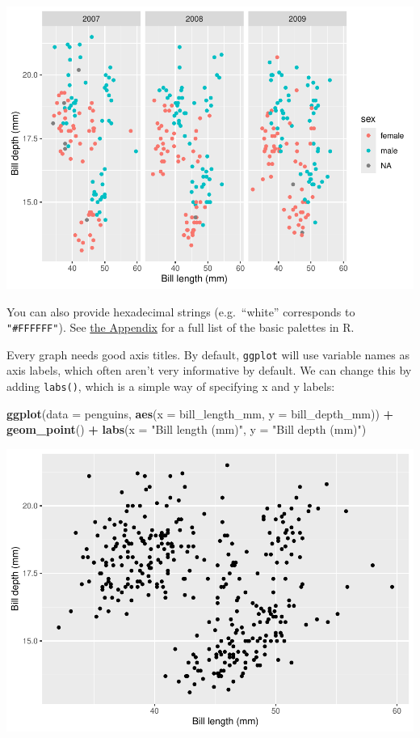 \documentclass[
]{book}
\newenvironment{Shaded}{\begin{snugshade}}{\end{snugshade}}
\newcommand{\AttributeTok}[1]{\textcolor[rgb]{0.13,0.29,0.53}{#1}}
\newcommand{\FunctionTok}[1]{\textcolor[rgb]{0.13,0.29,0.53}{\textbf{#1}}}
\newcommand{\NormalTok}[1]{#1}
\newcommand{\SpecialCharTok}[1]{\textcolor[rgb]{0.81,0.36,0.00}{\textbf{#1}}}
\newcommand{\StringTok}[1]{\textcolor[rgb]{0.31,0.60,0.02}{#1}}
\begin{document}
\includegraphics{_main_files/figure-latex/unnamed-chunk-62-1.pdf}

You can also provide hexadecimal strings (e.g.~``white'' corresponds to \texttt{"\#FFFFFF"}). See \hyperref[colours]{the Appendix} for a full list of the basic palettes in R.

Every graph needs good axis titles. By default, \texttt{ggplot} will use variable names as axis labels, which often aren't very informative by default. We can change this by adding \texttt{labs()}, which is a simple way of specifying x and y labels:

\begin{Shaded}
\begin{Highlighting}[]
\FunctionTok{ggplot}\NormalTok{(}\AttributeTok{data =}\NormalTok{ penguins, }\FunctionTok{aes}\NormalTok{(}\AttributeTok{x =}\NormalTok{ bill\_length\_mm, }\AttributeTok{y =}\NormalTok{ bill\_depth\_mm)) }\SpecialCharTok{+} 
  \FunctionTok{geom\_point}\NormalTok{() }\SpecialCharTok{+}
  \FunctionTok{labs}\NormalTok{(}\AttributeTok{x =} \StringTok{"Bill length (mm)"}\NormalTok{, }\AttributeTok{y =} \StringTok{"Bill depth (mm)"}\NormalTok{) }
\end{Highlighting}
\end{Shaded}

\includegraphics{_main_files/figure-latex/unnamed-chunk-63-1.pdf}
\end{document}
